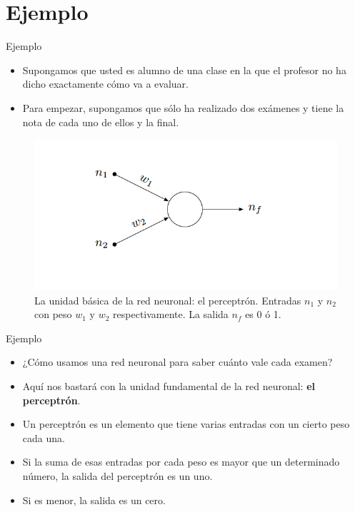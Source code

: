\documentclass[11pt,aspectratio=169]{beamer}
\begin{document}
\section{Ejemplo}
\begin{frame}{Ejemplo}
	\begin{itemize}
		\item Supongamos que usted es alumno de una clase en la que el profesor no ha dicho exactamente cómo va a evaluar.\pause 
		\item Para empezar, supongamos que sólo ha realizado dos exámenes y tiene la nota de cada uno de ellos y la final.
	\end{itemize}
	\begin{figure}
		\centering
		\includegraphics[scale=0.5]{img/rn01.png}
		\caption{La unidad básica de la red neuronal: el perceptrón. Entradas $n_1$ y $n_2$ con peso $w_1$ y $w_2$ respectivamente. 
		La salida $n_f$ es 0 ó 1.}
	\end{figure}
\end{frame}

\begin{frame}{Ejemplo}
	\begin{itemize}
		\item ¿Cómo usamos una red neuronal para saber cuánto vale cada examen?\pause 
		\item Aquí nos bastará con la unidad fundamental de la red neuronal: \textbf{el perceptrón}.\pause  
		\item Un perceptrón es un elemento que tiene varias entradas con un cierto peso cada una.\pause  
		\item Si la suma de esas entradas por cada peso es mayor que un determinado número, la salida del perceptrón es un uno.\pause 
		\item Si es menor, la salida es un cero.
	\end{itemize}
\end{frame}
\end{document}

